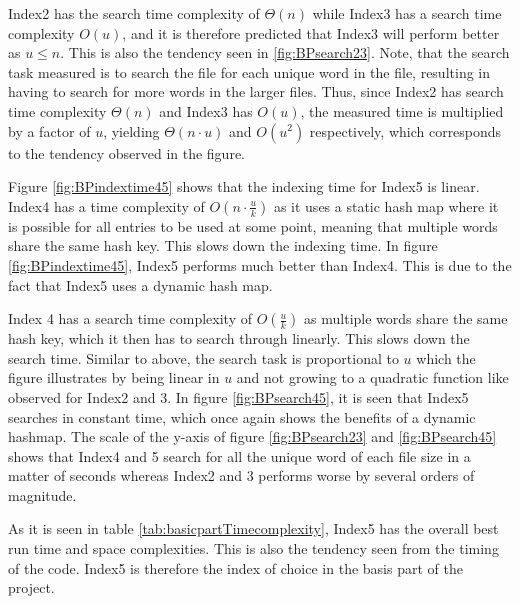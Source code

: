 Index2 has the search time complexity of $\Theta(n)$ while Index3 has a search time complexity $O(u)$, and it is therefore predicted that Index3 will perform better as $u\leq n$. This is also the tendency seen in \ref{fig:BPsearch23}. Note, that the search task measured is to search the file for each unique word in the file, resulting in having to search for more words in the larger files. Thus, since Index2 has search time complexity $\Theta(n)$ and Index3 has $O(u)$, the measured time is multiplied by a factor of $u$, yielding $\Theta(n\cdot u)$ and $O(u^2)$ respectively, which corresponds to the tendency observed in the figure. 

Figure \ref{fig:BPindextime45} shows that the indexing time for Index5 is linear. Index4 has a time complexity of $O(n\cdot \frac{u}{k})$ as it uses a static hash map where it is possible for all entries to be used at some point, meaning that multiple words share the same hash key. This slows down the indexing time. 
In figure \ref{fig:BPindextime45}, Index5 performs much better than Index4. This is due to the fact that Index5 uses a dynamic hash map. 

 Index 4 has a search time complexity of $O(\frac{u}{k})$ as multiple words share the same hash key, which it then has to search through linearly. This slows down the search time. Similar to above, the search task is proportional to $u$ which the figure illustrates by being linear in $u$ and not growing to a quadratic function like observed for Index2 and 3. In figure \ref{fig:BPsearch45}, it is seen that Index5 searches in constant time, which once again shows the benefits of a dynamic hashmap. The scale of the y-axis of figure \ref{fig:BPsearch23} and \ref{fig:BPsearch45} shows that Index4 and 5 search for all the unique word of each file size in a matter of seconds whereas Index2 and 3 performs worse by several orders of magnitude.

 As it is seen in table \ref{tab:basicpartTimecomplexity}, Index5 has the overall best run time and space complexities. This is also the tendency seen from the timing of the code. Index5 is therefore the index of choice in the basis part of the project.  
